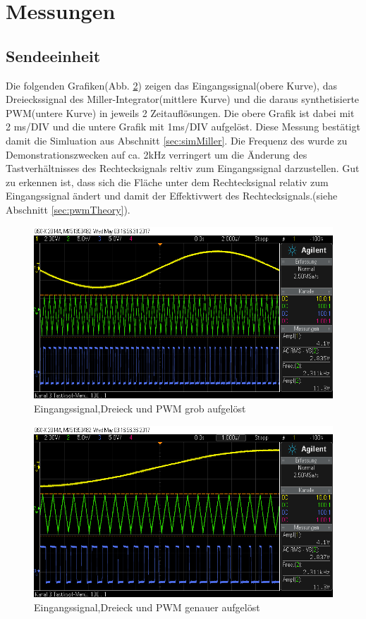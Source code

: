 \section{Messungen}

\subsection{Sendeeinheit}
Die folgenden Grafiken(Abb. \ref{fig:measMiller}) zeigen das Eingangssignal(obere Kurve), das Dreieckssignal des Miller-Integrator(mittlere Kurve) und die daraus synthetisierte PWM(untere Kurve) in jeweils 2 Zeitauflösungen. Die obere Grafik ist dabei mit 2 ms/DIV und die untere Grafik mit 1ms/DIV aufgelöst. Diese Messung bestätigt damit die Simluation aus Abschnitt \ref{sec:simMiller}. Die Frequenz des wurde zu Demonstrationszwecken auf ca. 2kHz verringert um die Änderung des Tastverhältnisses des Rechtecksignals reltiv zum Eingangssignal darzustellen. Gut zu erkennen ist, dass sich die Fläche unter dem Rechtecksignal relativ zum Eingangssignal ändert und damit der Effektivwert des Rechtecksignals.(siehe Abschnitt \ref{sec:pwmTheory}).
\begin{figure}[H]
	\centering
	\includegraphics[scale=0.45]{gfx/osziScreens/scope_3.png}
	\caption{Eingangssignal,Dreieck und PWM grob aufgelöst}
	\label{fig:measMiller}
\end{figure}

\begin{figure}[H]
	\centering
	\includegraphics[scale=0.45]{gfx/osziScreens/scope_4.png}
	\caption{Eingangssignal,Dreieck und PWM genauer aufgelöst}
	\label{fig:measMiller}
\end{figure}
